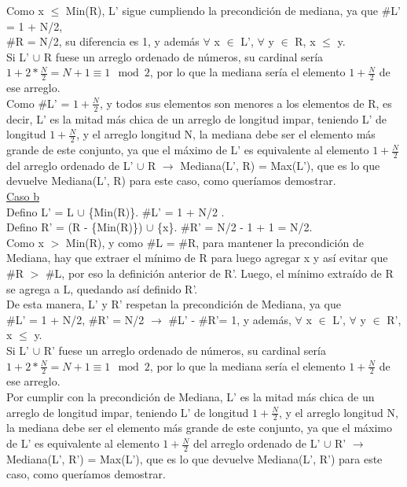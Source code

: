 \documentclass{article}
\theoremstyle{definition}
\theoremstyle{remark}
\begin{document}
Como x $\leq$ Min(R), L' sigue cumpliendo la precondición de mediana, ya que \#L' = 1 + N/2, \\ \#R = N/2, su diferencia es 1, y además $\forall$ x $\in$ L', $\forall$ y $\in$ R, x $\leq$ y. \\
Si L' $\cup$ R fuese un arreglo ordenado de números, su cardinal sería $1 + 2 * \frac{N}{2} = N + 1 \equiv 1 \mod 2$, por lo que la mediana sería el elemento $1 + \frac{N}{2}$ de ese arreglo. \\
Como \#L' = $1 + \frac{N}{2}$, y todos sus elementos son menores a los elementos de R, es decir, L' es la mitad más chica de un arreglo de longitud impar, teniendo L' de longitud $1 + \frac{N}{2}$, y el arreglo longitud N, la mediana debe ser el elemento más grande de este conjunto, ya que el máximo de L' es equivalente al elemento $1 + \frac{N}{2}$ del arreglo ordenado de L' $\cup$ R $\rightarrow$ Mediana(L', R) = Max(L'), que es lo que devuelve Mediana(L', R) para este caso, como queríamos demostrar.\\

\underline{Caso b}\\

Defino L' = L $\cup$ \{Min(R)\}.  \#L' = 1 + N/2 . \\

Defino R' = (R - \{Min(R)\}) $\cup$ \{x\}. \#R' = N/2 - 1 + 1 = N/2. \\

Como x $>$ Min(R), y como \#L = \#R, para mantener la precondición de Mediana, hay que extraer el mínimo de R para luego agregar x y así evitar que \#R $>$ \#L, por eso la definición anterior de R'. Luego, el mínimo extraído de R se agrega a L, quedando así definido R'. \\
De esta manera, L' y R' respetan la precondición de Mediana, ya que \\ \#L' = 1 + N/2, \#R' = N/2 $\rightarrow$ \#L' - \#R'= 1, y además, $\forall$ x $\in$ L', $\forall$ y $\in$ R', x $\leq$ y. \\
Si L' $\cup$ R' fuese un arreglo ordenado de números, su cardinal sería $1 + 2 * \frac{N}{2} = N + 1 \equiv 1 \mod 2$, por lo que la mediana sería el elemento $1 + \frac{N}{2}$ de ese arreglo. \\
Por cumplir con la precondición de Mediana, L' es la mitad más chica de un arreglo de longitud impar, teniendo L' de longitud $1 + \frac{N}{2}$, y el arreglo longitud N, la mediana debe ser el elemento más grande de este conjunto, ya que el máximo de L' es equivalente al elemento $1 + \frac{N}{2}$ del arreglo ordenado de L' $\cup$ R' $\rightarrow$ Mediana(L', R') = Max(L'), que es lo que devuelve Mediana(L', R') para este caso, como queríamos demostrar.\\
\end{document}
